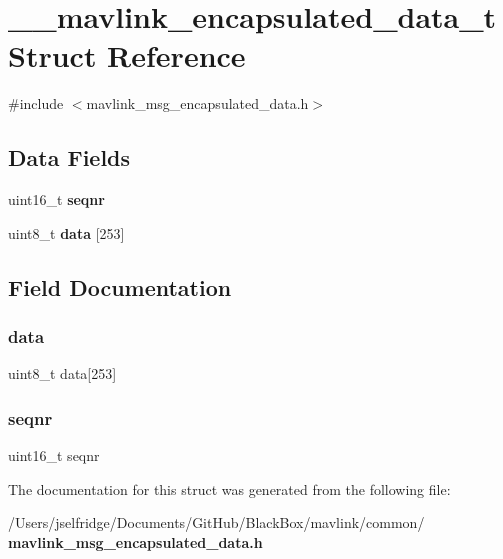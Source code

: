 \section{\+\_\+\+\_\+mavlink\+\_\+encapsulated\+\_\+data\+\_\+t Struct Reference}
\label{struct____mavlink__encapsulated__data__t}


{\ttfamily \#include $<$mavlink\+\_\+msg\+\_\+encapsulated\+\_\+data.\+h$>$}

\subsection*{Data Fields}
\begin{DoxyCompactItemize}
\item 
uint16\+\_\+t \textbf{ seqnr}
\item 
uint8\+\_\+t \textbf{ data} [253]
\end{DoxyCompactItemize}


\subsection{Field Documentation}
\mbox{\label{struct____mavlink__encapsulated__data__t_a56a0a4dec773bf2c96fd0dc4d2858a85}} 
\subsubsection{data}
{\footnotesize\ttfamily uint8\+\_\+t data[253]}

\mbox{\label{struct____mavlink__encapsulated__data__t_aa1b4bf79626757fdf1b659ce1c142b20}} 
\subsubsection{seqnr}
{\footnotesize\ttfamily uint16\+\_\+t seqnr}



The documentation for this struct was generated from the following file\+:\begin{DoxyCompactItemize}
\item 
/\+Users/jselfridge/\+Documents/\+Git\+Hub/\+Black\+Box/mavlink/common/\textbf{ mavlink\+\_\+msg\+\_\+encapsulated\+\_\+data.\+h}\end{DoxyCompactItemize}
